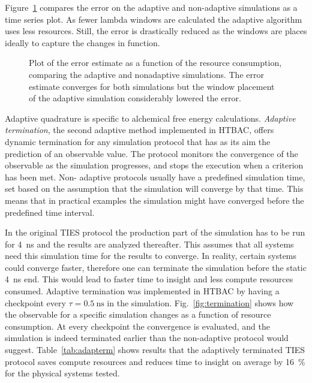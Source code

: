 Figure~\ref{fig:adapconv} compares the error on the adaptive and non-adaptive
simulations as a time series plot. As fewer lambda windows are calculated the
adaptive algorithm uses less resources. Still, the error is drastically
reduced as the windows are places ideally to capture the changes in function.

\begin{figure}
  
  \caption{Plot of the error estimate as a function of the resource
  consumption, comparing the adaptive and nonadaptive simulations. The error
  estimate converges for both simulations but the window placement of the
  adaptive simulation considerably lowered the error.}\label{fig:adapconv}
\up{}
\up{}
\end{figure}


Adaptive quadrature is specific to alchemical free energy calculations.
\emph{Adaptive termination}, the second adaptive method implemented in HTBAC,
offers dynamic termination for any simulation protocol that has as its aim
the prediction of an observable value. The protocol monitors the convergence
of the observable as the simulation progresses, and stops the execution when
a criterion has been met. Non- adaptive protocols usually have a predefined
simulation time, set based on the assumption that the simulation will
converge by that time. This means that in practical examples the simulation
might have converged before the predefined time interval.

In the original TIES protocol the production part of the simulation has to be
run for \SI{4}{\nano\second} and the results are analyzed thereafter. This
assumes that all systems need this simulation time for the results to
converge. In reality, certain systems could converge faster, therefore one
can terminate the simulation before the static \SI{4}{\nano\second} end. This
would lead to faster time to insight and less compute resources consumed.
Adaptive termination was implemented in HTBAC by having a checkpoint every
$\tau = \SI{0.5}{\nano\second}$ in the simulation. Fig.~\ref{fig:termination}
shows how the observable for a specific simulation changes as a function of
resource consumption. At every checkpoint the convergence is evaluated, and
the simulation is indeed terminated earlier than the non-adaptive protocol
would suggest. Table~\ref{tab:adapterm} shows results that the adaptively
terminated TIES protocol saves compute resources and reduces time to insight
on average by \SI{16}{\percent} for the physical systems tested.

